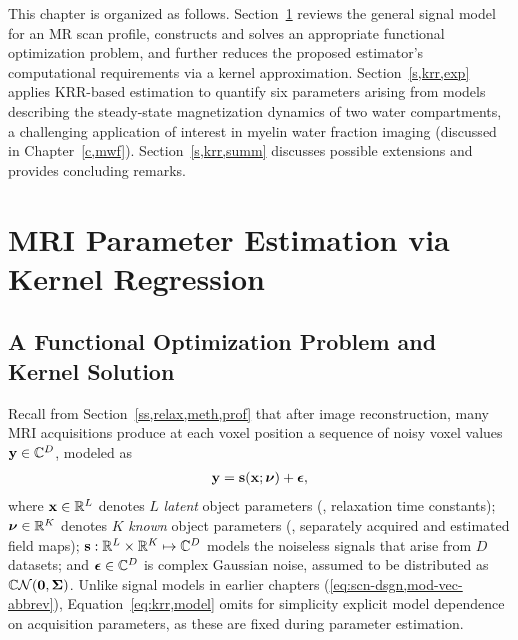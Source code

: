 This chapter is organized as follows.
Section~\ref{s,krr,meth}
reviews the general signal model
for an MR scan profile,
constructs and solves 
an appropriate functional optimization problem,
and further reduces the proposed estimator's
computational requirements
via a kernel approximation.
Section~\ref{s,krr,exp}
applies KRR-based estimation
to quantify six parameters arising 
from models describing the steady-state 
magnetization dynamics
of two water compartments,
a challenging application
of interest in myelin water fraction imaging 
(discussed in Chapter~\ref{c,mwf}).
Section~\ref{s,krr,summ}
discusses possible extensions 
and provides concluding remarks.

\section{MRI Parameter Estimation via Kernel Regression}
\label{s,krr,meth}

\subsection{A Functional Optimization Problem and Kernel Solution}
\label{ss,krr,meth,opt}

Recall from Section~\ref{ss,relax,meth,prof}
that after image reconstruction,
many MRI acquisitions
produce at each voxel position
a sequence of noisy voxel values 
$\mathbf{y} \in \mathbb{C}^{D}$, 
modeled as
\begin{align}
	\bmy = \bms\paren{\bmx; \bmnu} + \bmeps,
	\label{eq:krr,model}
\end{align}
where $\mathbf{x} \in \mathbb{R}^{L}$ denotes $L$ \emph{latent} object parameters 
(\eg, relaxation time constants);
$\boldsymbol{\nu} \in \mathbb{R}^{K}$ denotes $K$ \emph{known} object parameters 
(\eg, separately acquired and estimated field maps);
$\mathbf{s} : \mathbb{R}^{L} \times \mathbb{R}^{K} \mapsto \mathbb{C}^{D}$ 
models the noiseless signals that arise from $D$ datasets;
and $\boldsymbol{\epsilon} \in \mathbb{C}^{D}$
is complex Gaussian noise,
assumed to be distributed as $\cgauss{\bmzero}{\bmSig}$.
Unlike signal models in earlier chapters
(\cf \eqref{eq:scn-dsgn,mod-vec-abbrev}),
Equation~\ref{eq:krr,model} omits
for simplicity
explicit model dependence on acquisition parameters,
as these are fixed 
during parameter estimation.

